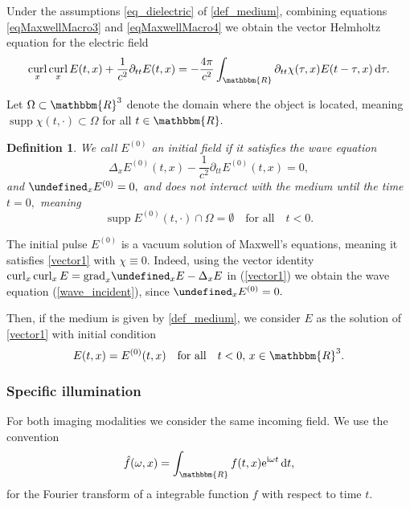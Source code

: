 \documentclass[a4paper,twoside,10pt]{article}
\theoremstyle{break}
\newtheorem{definition}[definition]{Definition}
\theoremstyle{nonumberplain}
\newcommand{\R}{\mathbbm{R}}
\newcommand{\e}{\mathrm e}
\renewcommand{\i}{\mathrm i}
\renewcommand{\d}{\,\mathrm d}
\DeclareMathOperator{\curl}{curl}
\let\div=\undefined
\DeclareMathOperator{\div}{div}
\DeclareMathOperator{\supp}{supp}
\begin{document}
Under the assumptions \eqref{eq_dielectric} of \autoref{def_medium}, combining equations \eqref{eqMaxwellMacro3} and \eqref{eqMaxwellMacro4} we obtain the vector Helmholtz equation for the electric field
\begin{equation}\label{vector1}
\curl_{x}\curl_{x} E(t,x) +\frac1{c^2}\partial_{tt} E(t,x) = -\frac{4\pi}{c^2}  \int_\R \partial_{tt}\chi (\tau , x) E(t-\tau, x) \d \tau .
\end{equation}

Let $\Omega \subset \R^3$ denote the domain where the object is located, meaning $\supp \chi (t,\cdot) \subset \Omega$ for all $t\in\R.$ 
\begin{definition}\label{definition_initial}
We call $E^{(0)}$ an initial field if it satisfies the wave equation
\begin{equation}\label{wave_incident}
\Delta_x E^{(0)} (t,x)-\frac1{c^2}\partial_{tt} E^{(0)}(t,x) = 0,
\end{equation}
and $\div_{x} E^{(0)} = 0,$ and
does not interact with the medium until the time $t=0,$ meaning
\[
\supp E^{(0)} (t,\cdot) \cap \Omega = \emptyset \quad \text{for all} \quad t<0 .
\]
\end{definition}

The initial pulse $E^{(0)}$ is a vacuum solution of Maxwell's equations, meaning it satisfies \eqref{vector1} with $\chi \equiv 0.$ Indeed, using the vector identity $\curl_x\curl_x E= \mbox{grad}_{x}\div_x E-\Delta_x E$ in (\ref{vector1}) we obtain the wave equation (\ref{wave_incident}), since $\div_x E^{(0)} = 0.$

Then, if the medium is given by \autoref{def_medium}, we consider $E$ as the solution of \eqref{vector1} with initial condition
\begin{equation}\label{eq_initial}
E(t,x) = E^{(0)} (t,x) \quad \text{for all} \quad t<0 , \, x\in \R^3 .
\end{equation}



\subsubsection{Specific illumination}
For both imaging modalities we consider the same incoming field. We use the convention
\[
\hat f (\omega ,x) = \int_\R f(t,x) \e^{\i\omega t} \d t, 
\] 
for the Fourier transform of a integrable function $f$ with respect to time $t.$
\end{document}
